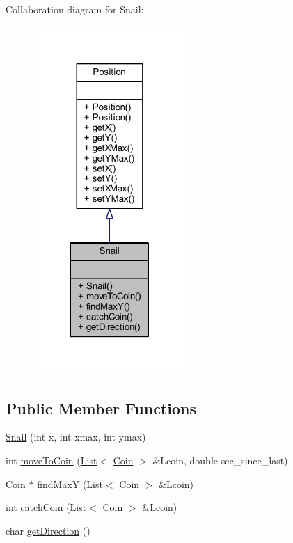 Collaboration diagram for Snail\+:
\nopagebreak
\begin{figure}[H]
\begin{center}
\leavevmode
\includegraphics[width=164pt]{class_snail__coll__graph}
\end{center}
\end{figure}
\subsection*{Public Member Functions}
\begin{DoxyCompactItemize}
\item 
\mbox{\hyperlink{class_snail_ad780249a02a8d7a850ccb7255a0cdf14}{Snail}} (int x, int xmax, int ymax)
\item 
int \mbox{\hyperlink{class_snail_ac02f07964ad0a0db28204acc7ed294b7}{move\+To\+Coin}} (\mbox{\hyperlink{class_list}{List}}$<$ \mbox{\hyperlink{class_coin}{Coin}} $>$ \&Lcoin, double sec\+\_\+since\+\_\+last)
\item 
\mbox{\hyperlink{class_coin}{Coin}} $\ast$ \mbox{\hyperlink{class_snail_a1dd9e6d2229dfc452f0163948c7f1980}{find\+MaxY}} (\mbox{\hyperlink{class_list}{List}}$<$ \mbox{\hyperlink{class_coin}{Coin}} $>$ \&Lcoin)
\item 
int \mbox{\hyperlink{class_snail_a2a9deee0c65a5d30f92efd054c6d4155}{catch\+Coin}} (\mbox{\hyperlink{class_list}{List}}$<$ \mbox{\hyperlink{class_coin}{Coin}} $>$ \&Lcoin)
\item 
char \mbox{\hyperlink{class_snail_a5b4774b31b0eb0253910680d4e49f403}{get\+Direction}} ()
\end{DoxyCompactItemize}


